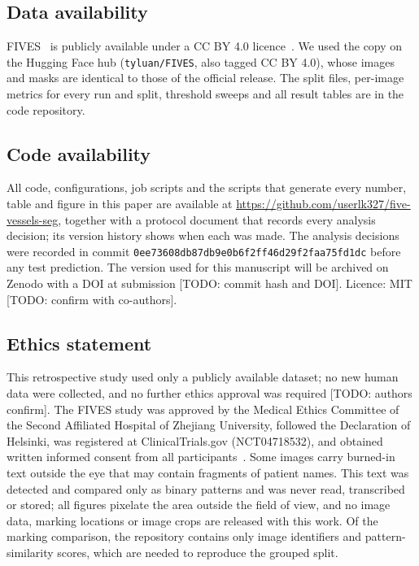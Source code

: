 \subsection*{Data availability}
FIVES~\cite{jin2022fives} is publicly available under a CC BY 4.0 licence~\cite{jin2022fivesdata}. We used the copy on
the Hugging Face hub (\texttt{tyluan/FIVES}, also tagged CC BY 4.0), whose images and masks are identical to those of the
official release. The split files, per-image metrics for every run and
split, threshold sweeps and all result tables are in the code repository.

\subsection*{Code availability}
All code, configurations, job scripts and the scripts that generate every number, table and figure in this paper are
available at \url{https://github.com/userlk327/five-vessels-seg}, together with a protocol document that records every
analysis decision; its version history shows when each was made. The analysis decisions were recorded in commit
\texttt{0ee73608db87db9e0b6f2ff46d29f2faa75fd1dc} before any test prediction. The version used for this manuscript will
be archived on Zenodo with a DOI at submission [TODO: commit hash and DOI]. Licence: MIT [TODO: confirm with co-authors].

\subsection*{Ethics statement}
This retrospective study used only a publicly available dataset; no new human data were collected, and no further ethics
approval was required [TODO: authors confirm]. The FIVES study was approved by the Medical Ethics Committee of the Second
Affiliated Hospital of Zhejiang University, followed the Declaration of Helsinki, was registered at ClinicalTrials.gov
(NCT04718532), and obtained written informed consent from all participants~\cite{jin2022fives}. Some images carry
burned-in text outside the eye that may contain fragments of patient names. This text was detected and compared only as
binary patterns and was never read, transcribed or stored; all figures pixelate the area outside the field of view, and
no image data, marking locations or image crops are released with this work. Of the marking comparison, the repository
contains only image identifiers and pattern-similarity scores, which are needed to reproduce the grouped split.

